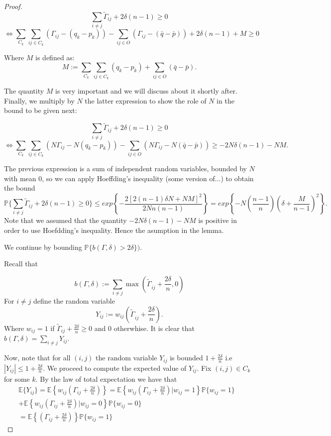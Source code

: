 \documentclass[12pt]{amsart}
\numberwithin{equation}{section}
\newcommand{\PP}{\mathbb{P}}
\newcommand{\EE}{\mathbb{E}}
\begin{document}
\begin{proof}
\[
 \sum_{i\neq j} \widetilde{\Gamma}_{ij} + 2\delta (n-1) \geq 0 
\]
\[
\Leftrightarrow \sum_{C_k} \sum_{ij \in C_k} \left(\Gamma_{ij}-(q_k-p_k)\right) - \sum_{ij \in O}\left(\Gamma_{ij}-(\bar{q}-\bar{p})\right)  + 2\delta(n-1)+M \geq 0  
\]

Where $M$ is defined as:
\[
M:= \sum_{C_k} \sum_{ij \in C_k}(q_k-p_k)+ \sum_{ij \in O}(\bar{q}-\bar{p}).
\]

The quantity $M$ is very important and we will discuss about it shortly after.
Finally, we multiply by $N$ the latter expression to show the role of $N$ in the bound to be given next: 

\[
 \sum_{i\neq j} \widetilde{\Gamma}_{ij} + 2\delta (n-1) \geq 0 
\]
\[
\Leftrightarrow \sum_{C_k} \sum_{ij \in C_k} \left(N\Gamma_{ij}-N(q_k-p_k)\right) - \sum_{ij \in O}\left(N\Gamma_{ij}-N(\bar{q}-\bar{p})\right)\geq  - 2N\delta(n-1)-NM.  
\]

The previous expression is a sum of independent random variables, bounded by $N$ with mean $0$, so we can apply Hoeffding's inequality (some version of...) to obtain the bound
\[
\PP\{ \sum_{i\neq j} \widetilde{\Gamma}_{ij}+ 2\delta (n-1) \geq 0 \} \leq exp\left\{-\frac{2[2(n-1)\delta N+NM]^2}{2Nn(n-1)}\right\}=exp\left\{-N \left ( \frac{n-1}{n} \right ) \left (\delta +\frac{M}{n-1}\right )^2 \right\}.
\]
Note that we assumed that the quantity $- 2N\delta(n-1)-NM$ is positive in order to use Hoefdding's inequality. Hence the asumption in the lemma. 


We continue by bounding $\PP\{b(\Gamma,\delta)> 2\delta\})$.

Recall that 

\[b(\Gamma,\delta):=\sum_{i\neq j} \max\left(\widetilde{\Gamma_{}}_{ij}+\frac{2\delta}{n},0\right)
\]
For $i\neq j$ define the random variable 
\[
Y_{ij}:= w_{ij}\left(\widetilde{\Gamma_{}}_{ij}+\frac{2\delta}{n}\right).
\]
Where $w_{ij}=1$ if $\widetilde{\Gamma}_{ij}+\frac{2\delta}{n} \geq 0$ and $0$ otherwhise. It is clear that $b(\Gamma,\delta) = \sum_{i\neq j}Y_{ij}$.

Now, note that for all $(i,j)$ the random variable $Y_{ij}$ is bounded $1+\frac{2\delta}{n}$ i.e 
$|Y_{ij}|\leq 1+\frac{2\delta}{n}$.
We proceed to compute the expected value of $Y_{ij}$.
Fix $(i,j) \in C_k$ for some $k$.
By the law of total expectation we have that
\[
\begin{aligned}
\EE\{Y_{ij}\}=\EE \left \{w_{ij}\left ( \Gamma_{ij} +\frac{2\delta}{n}\right ) \right\}= \EE\left \{ w_{ij}\left ( \Gamma_{ij} +\frac{2\delta}{n}\right ) | w_{ij} = 1\right \}\PP\{w_{ij}=1\}& \\
+ \EE\left \{ w_{ij}\left ( \Gamma_{ij} +\frac{2\delta}{n}\right ) | w_{ij} = 0\right \}\PP\{w_{ij}=0\} & \\
=\EE\left \{ \left ( \Gamma_{ij} +\frac{2\delta}{n}\right )\right \}\PP\{w_{ij}=1\}
\end{aligned}
\]


\end{proof}
\end{document}
